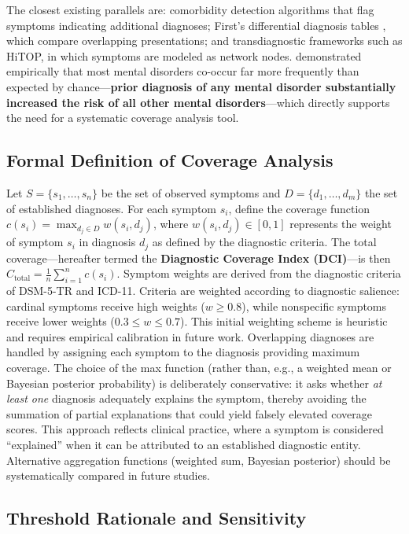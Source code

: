 \documentclass[11pt,a4paper]{article}
\begin{document}
The closest existing parallels are: comorbidity detection algorithms that flag symptoms indicating additional diagnoses; First's differential diagnosis tables \citep{First2024}, which compare overlapping presentations; and transdiagnostic frameworks such as HiTOP, in which symptoms are modeled as network nodes. \citet{PlanaRipoll2019} demonstrated empirically that most mental disorders co-occur far more frequently than expected by chance---\textbf{prior diagnosis of any mental disorder substantially increased the risk of all other mental disorders}---which directly supports the need for a systematic coverage analysis tool.

\subsection{Formal Definition of Coverage Analysis}

Let $S = \{s_1, \ldots, s_n\}$ be the set of observed symptoms and $D = \{d_1, \ldots, d_m\}$ the set of established diagnoses. For each symptom $s_i$, define the coverage function $c(s_i) = \max_{d_j \in D} w(s_i, d_j)$, where $w(s_i, d_j) \in [0, 1]$ represents the weight of symptom $s_i$ in diagnosis $d_j$ as defined by the diagnostic criteria. The total coverage---hereafter termed the \textbf{Diagnostic Coverage Index (DCI)}---is then $C_{\text{total}} = \frac{1}{n} \sum_{i=1}^{n} c(s_i)$. Symptom weights are derived from the diagnostic criteria of DSM-5-TR and ICD-11. Criteria are weighted according to diagnostic salience: cardinal symptoms receive high weights ($w \geq 0.8$), while nonspecific symptoms receive lower weights ($0.3 \leq w \leq 0.7$). This initial weighting scheme is heuristic and requires empirical calibration in future work. Overlapping diagnoses are handled by assigning each symptom to the diagnosis providing maximum coverage. The choice of the max function (rather than, e.g., a weighted mean or Bayesian posterior probability) is deliberately conservative: it asks whether \textit{at least one} diagnosis adequately explains the symptom, thereby avoiding the summation of partial explanations that could yield falsely elevated coverage scores. This approach reflects clinical practice, where a symptom is considered ``explained'' when it can be attributed to an established diagnostic entity. Alternative aggregation functions (weighted sum, Bayesian posterior) should be systematically compared in future studies.

\subsection{Threshold Rationale and Sensitivity}
\end{document}
